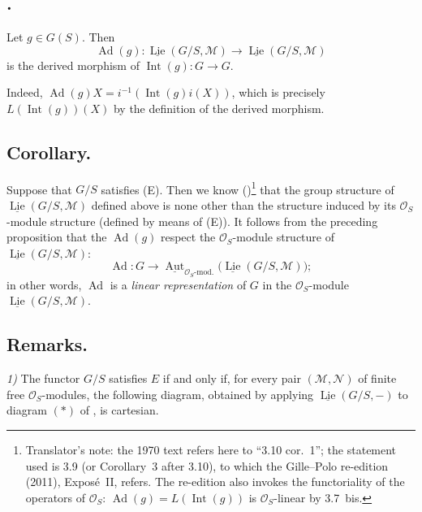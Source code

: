 \subsection*{.}
Let \(g\in G(S)\). Then
\[
  \operatorname{Ad}(g):
  \underline{\operatorname{Lie}}(G/S,\mathcal M)
  \longrightarrow
  \underline{\operatorname{Lie}}(G/S,\mathcal M)
\]
is the derived morphism of
\(\operatorname{Int}(g):G\to G\).

Indeed,
\(\operatorname{Ad}(g)X=i^{-1}(\operatorname{Int}(g)i(X))\), which is
precisely \(L(\operatorname{Int}(g))(X)\) by the definition of the
derived morphism.

\subsection*{Corollary.}
Suppose that \(G/S\) satisfies (E). Then we know
()\footnote{Translator's note: the 1970 text refers here to
``3.10 cor.~1''; the statement used is 3.9 (or Corollary~3 after 3.10), to
which the Gille--Polo re-edition (2011), Expos\'e~II, refers. The
re-edition also invokes the functoriality of the operators of
\(\mathcal O_S\): \(\operatorname{Ad}(g)=L(\operatorname{Int}(g))\) is
\(\mathcal O_S\)-linear by 3.7~bis.} that the group structure of
\(\underline{\operatorname{Lie}}(G/S,\mathcal M)\) defined above is none
other than the structure induced by its \(\mathcal O_S\)-module structure
(defined by means of (E)). It follows from the preceding proposition that
the \(\operatorname{Ad}(g)\) respect the \(\mathcal O_S\)-module structure
of \(\underline{\operatorname{Lie}}(G/S,\mathcal M)\):
\[
  \operatorname{Ad}:G\longrightarrow
  \underline{\operatorname{Aut}}_{\mathcal O_S\text{-mod.}}
    \bigl(\underline{\operatorname{Lie}}(G/S,\mathcal M)\bigr);
\]
in other words, \(\operatorname{Ad}\) is a \emph{linear representation} of
\(G\) in the \(\mathcal O_S\)-module
\(\underline{\operatorname{Lie}}(G/S,\mathcal M)\).

\subsection*{Remarks.}
\textit{1)} The functor \(G/S\) satisfies \(E\) if and only if, for every
pair \((\mathcal M,\mathcal N)\) of finite free
\(\mathcal O_S\)-modules, the following diagram, obtained by applying
\(\underline{\operatorname{Lie}}(G/S,-)\) to diagram \((*)\) of , is
cartesian.

